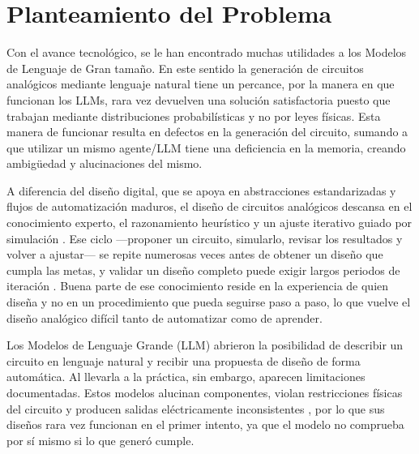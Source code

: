 \section*{Planteamiento del Problema}

Con el avance tecnológico, se le han encontrado muchas utilidades a los Modelos de Lenguaje de Gran tamaño.
En este sentido la generación de circuitos analógicos mediante lenguaje natural tiene un percance, por la manera en que funcionan los LLMs, rara vez devuelven una solución satisfactoria puesto que trabajan mediante distribuciones probabilísticas y no por leyes físicas.
Esta manera de funcionar resulta en defectos en la generación del circuito, sumando a que utilizar un mismo agente/LLM tiene una deficiencia en la memoria, creando ambigüedad y alucinaciones del mismo.


A diferencia del diseño digital, que se apoya en abstracciones estandarizadas y flujos de automatización maduros, el diseño de circuitos analógicos descansa en el conocimiento experto, el razonamiento heurístico y un ajuste iterativo guiado por simulación \cite{analogagent}. Ese ciclo ---proponer un circuito, simularlo, revisar los resultados y volver a ajustar--- se repite numerosas veces antes de obtener un diseño que cumpla las metas, y validar un diseño completo puede exigir largos periodos de iteración \cite{pcbschemagen}. Buena parte de ese conocimiento reside en la experiencia de quien diseña y no en un procedimiento que pueda seguirse paso a paso, lo que vuelve el diseño analógico difícil tanto de automatizar como de aprender.

Los Modelos de Lenguaje Grande (LLM) abrieron la posibilidad de describir un circuito en lenguaje natural y recibir una propuesta de diseño de forma automática. Al llevarla a la práctica, sin embargo, aparecen limitaciones documentadas. Estos modelos alucinan componentes, violan restricciones físicas del circuito y producen salidas eléctricamente inconsistentes \cite{circuitlm}, por lo que sus diseños rara vez funcionan en el primer intento, ya que el modelo no comprueba por sí mismo si lo que generó cumple. 

